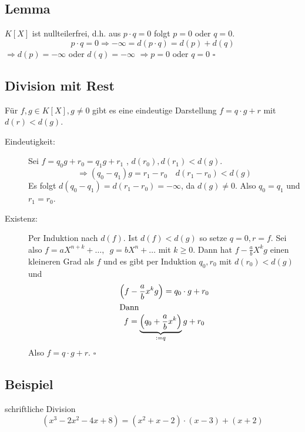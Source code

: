 \subsection[Lemma: Der Polynomring ist nullteilerfrei]{Lemma} %
\label{sub:46}
$K[X]$ ist nullteilerfrei, d.h. aus $p \cdot q =0$ folgt $p=0$ oder $q=0$.
\[
	p \cdot q = 0 \Longrightarrow - \infty = d(p \cdot q)= d(p) + d(q)
\]
$\Rightarrow d(p)= -\infty$ oder $d(q)=-\infty$ \quad $\Rightarrow p= 0$ oder $q=0$ \hfill \( \square \)

\subsection[Division mit Rest bei Polynomen]{Division mit Rest} %
\label{sub:47}
Für $f,g \in K[X], g\not=0$ gibt es eine eindeutige Darstellung $f=q \cdot g + r$ mit $d(r) < d(g)$.
\begin{description}
	\item[Eindeutigkeit:] Sei $f=q_0 g + r_0 = q_1 g + r_1 $ , $d(r_0), d(r_1) < d(g)$. 
	\[
		\Rightarrow (q_0 -q_1)g = r_1 - r_0 \quad d(r_1 -r_0) < d(g)
	\]
	Es folgt $d(q_0 - q_1) = d(r_1 -r_0)= - \infty$, da $d(g)\not= 0$. Also $q_0=q_1$ und $r_1=r_0$.
	\item[Existenz:] Per Induktion nach $d(f)$. Ist $d(f)<d(g)$ so setze $q=0, r=f$. Sei also $f=a X^{n+k}+ \ldots , \enspace g=bX^n + \ldots $ mit $k\ge 0$. Dann hat
	$f- \frac{a}{b} X^k g $ einen kleineren Grad als $f$ und es gibt per Induktion $q_0,r_0$ mit $d(r_0)<d(g)$ und
	\begin{gather*}
		\enbrace*{f - \frac{a}{b} x^k g} = q_0 \cdot g + r_0 \\
		\intertext{Dann}
		f = \underbrace{\enbrace*{q_0 + \frac{a}{b} x^k}}_{:= q} g + r_0 
	\end{gather*}
	Also $f= q \cdot g +r$. \hfill \( \square \)	
\end{description}

\subsection[Beispiel für Polynomdivision]{Beispiel} %
\label{sub:48}
schriftliche Division
\[
	(x^3 -2x^2 - 4x +8)= (x^2 +x -2) \cdot (x -3) +(x+2)
\]


